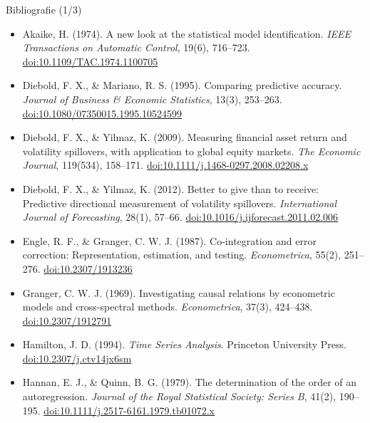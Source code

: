 \begin{frame}{Bibliografie (1/3)}
\itemsize{\scriptsize}
\begin{itemize}
    \item Akaike, H. (1974). A new look at the statistical model identification. \textit{IEEE Transactions on Automatic Control}, 19(6), 716--723. \href{https://doi.org/10.1109/TAC.1974.1100705}{doi:10.1109/TAC.1974.1100705}
    \item Diebold, F. X., \& Mariano, R. S. (1995). Comparing predictive accuracy. \textit{Journal of Business \& Economic Statistics}, 13(3), 253--263. \href{https://doi.org/10.1080/07350015.1995.10524599}{doi:10.1080/07350015.1995.10524599}
    \item Diebold, F. X., \& Yilmaz, K. (2009). Measuring financial asset return and volatility spillovers, with application to global equity markets. \textit{The Economic Journal}, 119(534), 158--171. \href{https://doi.org/10.1111/j.1468-0297.2008.02208.x}{doi:10.1111/j.1468-0297.2008.02208.x}
    \item Diebold, F. X., \& Yilmaz, K. (2012). Better to give than to receive: Predictive directional measurement of volatility spillovers. \textit{International Journal of Forecasting}, 28(1), 57--66. \href{https://doi.org/10.1016/j.ijforecast.2011.02.006}{doi:10.1016/j.ijforecast.2011.02.006}
    \item Engle, R. F., \& Granger, C. W. J. (1987). Co-integration and error correction: Representation, estimation, and testing. \textit{Econometrica}, 55(2), 251--276. \href{https://doi.org/10.2307/1913236}{doi:10.2307/1913236}
    \item Granger, C. W. J. (1969). Investigating causal relations by econometric models and cross-spectral methods. \textit{Econometrica}, 37(3), 424--438. \href{https://doi.org/10.2307/1912791}{doi:10.2307/1912791}
    \item Hamilton, J. D. (1994). \textit{Time Series Analysis}. Princeton University Press. \href{https://doi.org/10.2307/j.ctv14jx6sm}{doi:10.2307/j.ctv14jx6sm}
    \item Hannan, E. J., \& Quinn, B. G. (1979). The determination of the order of an autoregression. \textit{Journal of the Royal Statistical Society: Series B}, 41(2), 190--195. \href{https://doi.org/10.1111/j.2517-6161.1979.tb01072.x}{doi:10.1111/j.2517-6161.1979.tb01072.x}
\end{itemize}
\end{frame}

